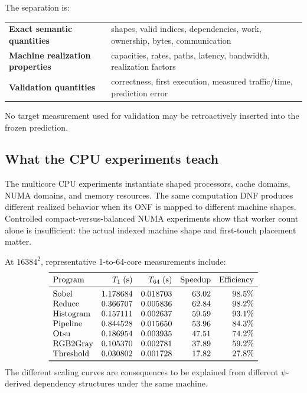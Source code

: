 \documentclass[11pt]{article}
\begin{document}
The separation is:
\begin{center}
\begin{tabular}{p{}p{}}
\textbf{Exact semantic quantities} & shapes, valid indices, dependencies, work, ownership, bytes, communication\\
\textbf{Machine realization properties} & capacities, rates, paths, latency, bandwidth, realization factors\\
\textbf{Validation quantities} & correctness, first execution, measured traffic/time, prediction error
\end{tabular}
\end{center}

No target measurement used for validation may be retroactively inserted into the frozen
prediction.

\subsection{What the CPU experiments teach}

The multicore CPU experiments instantiate shaped processors, cache domains, NUMA domains,
and memory resources.  The same computation DNF produces different realized behavior when its
ONF is mapped to different machine shapes.  Controlled compact-versus-balanced NUMA experiments
show that worker count alone is insufficient: the actual indexed machine shape and first-touch
placement matter.

At \(16384^2\), representative 1-to-64-core measurements include:
\[
\begin{array}{lrrrr}
\toprule
\text{Program} & T_1\;(\mathrm{s}) & T_{64}\;(\mathrm{s}) & \text{Speedup} & \text{Efficiency}\\
\midrule
\text{Sobel} & 1.178684 & 0.018703 & 63.02 & 98.5\%\\
\text{Reduce} & 0.366707 & 0.005836 & 62.84 & 98.2\%\\
\text{Histogram} & 0.157111 & 0.002637 & 59.59 & 93.1\%\\
\text{Pipeline} & 0.844528 & 0.015650 & 53.96 & 84.3\%\\
\text{Otsu} & 0.186954 & 0.003935 & 47.51 & 74.2\%\\
\text{RGB2Gray} & 0.105370 & 0.002781 & 37.89 & 59.2\%\\
\text{Threshold} & 0.030802 & 0.001728 & 17.82 & 27.8\%\\
\bottomrule
\end{array}
\]
The different scaling curves are consequences to be explained from different \(\psi\)-derived
dependency structures under the same machine.
\end{document}
